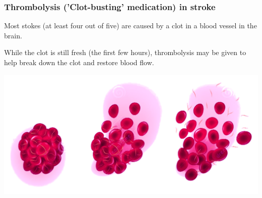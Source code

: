 \begin{frame}
\frametitle{Thrombolysis ('Clot-busting' medication) in stroke}

Most stokes (at least four out of five) are caused by a clot in a blood vessel in the brain. 

\vspace{3mm}

While the clot is still fresh (the first few hours), thrombolysis may be given to help break down the clot and restore blood flow.

\begin{center}
\includegraphics[width=1.0\textwidth]{./images/thrombolysis_mechanism}
\end{center}


\end{frame}